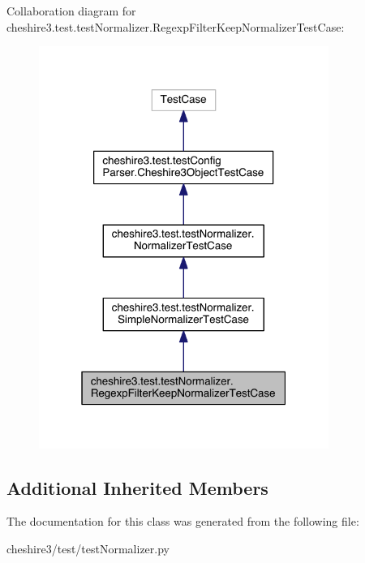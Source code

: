Collaboration diagram for cheshire3.\-test.\-test\-Normalizer.\-Regexp\-Filter\-Keep\-Normalizer\-Test\-Case\-:
\nopagebreak
\begin{figure}[H]
\begin{center}
\leavevmode
\includegraphics[width=268pt]{classcheshire3_1_1test_1_1test_normalizer_1_1_regexp_filter_keep_normalizer_test_case__coll__graph}
\end{center}
\end{figure}
\subsection*{Additional Inherited Members}


The documentation for this class was generated from the following file\-:\begin{DoxyCompactItemize}
\item 
cheshire3/test/test\-Normalizer.\-py\end{DoxyCompactItemize}
